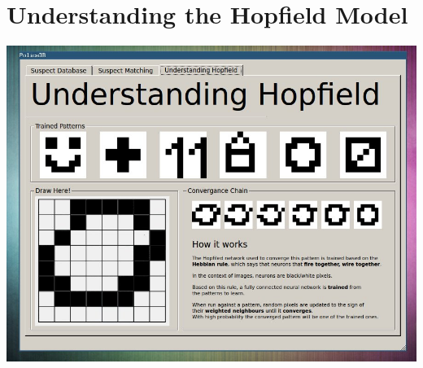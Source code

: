 \section{Understanding the Hopfield Model}
\begin{center}
\includegraphics[scale=0.5]{screenshots-small/gui3.jpg}
\end{center}
